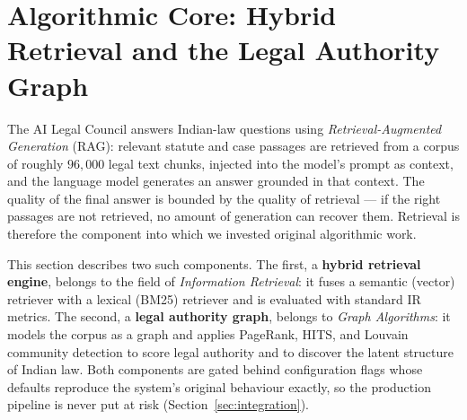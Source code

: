 %
%
%

\section{Algorithmic Core: Hybrid Retrieval and the Legal Authority Graph}
\label{sec:core-cs}

The AI Legal Council answers Indian-law questions using \emph{Retrieval-Augmented
Generation} (RAG): relevant statute and case passages are retrieved from a corpus of
roughly $96{,}000$ legal text chunks, injected into the model's prompt as context, and
the language model generates an answer grounded in that context. The quality of the final
answer is bounded by the quality of retrieval --- if the right passages are not retrieved,
no amount of generation can recover them. Retrieval is therefore the component into which
we invested original algorithmic work.

This section describes two such components. The first, a \textbf{hybrid retrieval engine},
belongs to the field of \emph{Information Retrieval}: it fuses a semantic (vector) retriever
with a lexical (BM25) retriever and is evaluated with standard IR metrics. The second, a
\textbf{legal authority graph}, belongs to \emph{Graph Algorithms}: it models the corpus as
a graph and applies PageRank, HITS, and Louvain community detection to score legal authority
and to discover the latent structure of Indian law. Both components are gated behind
configuration flags whose defaults reproduce the system's original behaviour exactly, so the
production pipeline is never put at risk (Section~\ref{sec:integration}).

